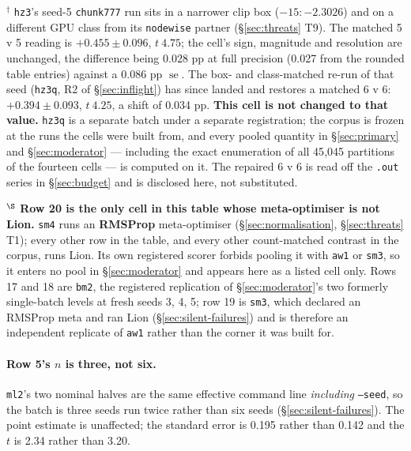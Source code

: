\documentclass[10pt,letterpaper]{article}
\newcommand{\arm}[1]{\texttt{#1}}
\DeclareMathOperator{\se}{se}
\begin{document}
\begin{table}[htbp]
\vspace{0.4em}
\begin{minipage}{\linewidth}\footnotesize
$^{\dagger}$ \arm{hz3}'s seed-5 \arm{chunk777} run sits in a narrower clip box
($-15{:}{-}2.3026$) and on a different GPU class from its \arm{nodewise} partner
(\S\ref{sec:threats} T9). The matched 5 v 5 reading is $\mathbf{+0.455 \pm 0.096}$, $t\ 4.75$;
the cell's sign, magnitude and resolution are unchanged, the difference being 0.028 pp at full
precision (0.027 from the rounded table entries) against
a 0.086 pp $\se$. The box- and class-matched re-run of that seed (\arm{hz3q}, R2 of
\S\ref{sec:inflight}) has since landed and restores a matched 6 v 6:
$\mathbf{+0.394 \pm 0.093}$, $t\ 4.25$, a shift of 0.034 pp. \textbf{This cell is not changed to
that value.} \arm{hz3q} is a separate batch under a separate registration; the corpus is frozen at
the runs the cells were built from, and every pooled quantity in \S\ref{sec:primary} and
\S\ref{sec:moderator} --- including the exact enumeration of all 45{,}045 partitions of the
fourteen cells --- is computed on it. The repaired 6 v 6 is read off the \texttt{.out} series in
\S\ref{sec:budget} and is disclosed here, not substituted.

\vspace{0.3em}
$^{\S}$ \textbf{Row 20 is the only cell in this table whose meta-optimiser is not Lion.}
\arm{sm4} runs an \textbf{RMSProp} meta-optimiser (\S\ref{sec:normalisation},
\S\ref{sec:threats} T1); every other row in the table, and every other count-matched contrast in
the corpus, runs Lion. Its own registered scorer forbids pooling it with \arm{aw1} or \arm{sm3},
so it enters no pool in \S\ref{sec:moderator} and appears here as a listed cell only. Rows 17
and 18 are \arm{bm2}, the registered replication of \S\ref{sec:moderator}'s two formerly
single-batch levels at fresh seeds 3, 4, 5; row 19 is \arm{sm3}, which declared an RMSProp meta
and ran Lion (\S\ref{sec:silent-failures}) and is therefore an independent replicate of
\arm{aw1} rather than the corner it was built for.
\end{minipage}
\end{table}

\paragraph{Row 5's $n$ is three, not six.}
\arm{ml2}'s two nominal halves are the same effective command line \emph{including}
\texttt{--seed}, so the batch is three seeds run twice rather than six seeds
(\S\ref{sec:silent-failures}). The point estimate is unaffected; the standard error is 0.195
rather than 0.142 and the $t$ is 2.34 rather than 3.20.
\end{document}

